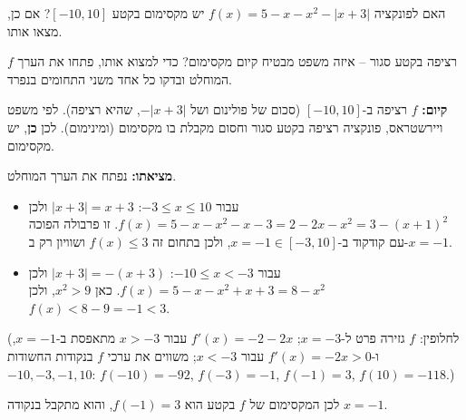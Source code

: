 
\begin{question}
האם לפונקציה $f(x)=5-x-x^2-|x+3|$ יש מקסימום בקטע $[-10,10]$? אם כן, מצאו אותו.
\end{question}

\begin{hint}
$f$ רציפה בקטע סגור -- איזה משפט מבטיח קיום מקסימום? כדי למצוא אותו, פתחו את הערך המוחלט ובדקו כל אחד משני התחומים בנפרד.
\end{hint}

\begin{solution}
\textbf{קיום:} $f$ רציפה ב-$[-10,10]$ (סכום של פולינום ושל $-|x+3|$, שהיא רציפה). לפי משפט ויירשטראס, פונקציה רציפה בקטע סגור וחסום מקבלת בו מקסימום (ומינימום). לכן \textbf{כן}, יש מקסימום.

\textbf{מציאתו:} נפתח את הערך המוחלט.
\begin{itemize}
  \item עבור $-3\le x\le10$: $|x+3|=x+3$ ולכן $f(x)=5-x-x^2-x-3=2-2x-x^2=3-(x+1)^2$. זו פרבולה הפוכה עם קודקוד ב-$x=-1\in[-3,10]$, ולכן בתחום זה $f(x)\le3$ ושוויון רק ב-$x=-1$.
  \item עבור $-10\le x<-3$: $|x+3|=-(x+3)$ ולכן $f(x)=5-x-x^2+x+3=8-x^2$. כאן $x^2>9$, ולכן $f(x)<8-9=-1<3$.
\end{itemize}
(לחלופין: $f$ גזירה פרט ל-$x=-3$; $f'(x)=-2-2x$ עבור $x>-3$ מתאפסת ב-$x=-1$, ו-$f'(x)=-2x>0$ עבור $x<-3$; משווים את ערכי $f$ בנקודות החשודות $-10,-3,-1,10$: $f(-10)=-92$, $f(-3)=-1$, $f(-1)=3$, $f(10)=-118$.)

לכן המקסימום של $f$ בקטע הוא $\boxed{f(-1)=3}$, והוא מתקבל בנקודה $x=-1$.
\end{solution}
